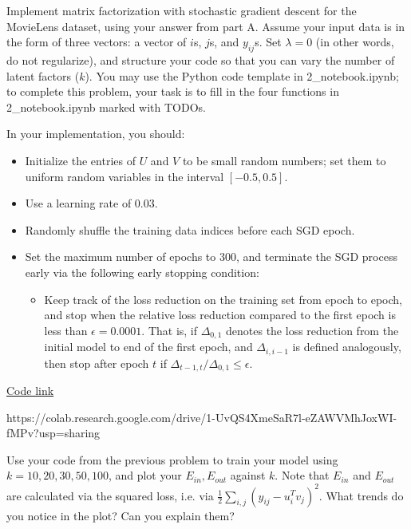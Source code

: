 Implement matrix factorization with stochastic gradient descent for the MovieLens dataset, using your answer from part A. Assume your input data is in the form of three vectors: a vector of $i$s, $j$s, and $y_{ij}$s. Set $\lambda = 0$ (in other words, do not regularize), and structure your code so that you can vary the number of latent factors ($k$). You may use the Python code template in 2_notebook.ipynb; to complete this problem, your task is to fill in the four functions in 2_notebook.ipynb marked with TODOs.

In your implementation, you should:

\begin{itemize}
\item Initialize the entries of $U$ and $V$ to be small random numbers; set them to uniform random variables in the interval $[-0.5, 0.5]$.
\item Use a learning rate of 0.03.
\item Randomly shuffle the training data indices before each SGD epoch.
\item Set the maximum number of epochs to 300, and terminate the SGD process early via the following early stopping condition:
\begin{itemize}
\item Keep track of the loss reduction on the training set from epoch to epoch, and stop when the relative loss reduction compared to the first epoch is less than $\epsilon = 0.0001$.  That is, if $\Delta_{0,1}$ denotes the loss reduction from the initial model to end of the first epoch, and $\Delta_{i, i-1}$ is defined analogously, then stop after epoch $t$ if $\Delta_{t-1,t} / \Delta_{0,1} \leq \epsilon$.
\end{itemize}
\end{itemize}

\begin{solution}
\href{https://colab.research.google.com/drive/1-UvQS4XmeSaR7l-eZAWVMhJoxWI-fMPv?usp=sharing}{Code link}

https://colab.research.google.com/drive/1-UvQS4XmeSaR7l-eZAWVMhJoxWI-fMPv?usp=sharing

\end{solution}

\newpage

\problem[5]
Use your code from the previous problem to train your model using $k=10, 20, 30, 50, 100$, and plot your $E_{in}, E_{out}$ against $k$. Note that $E_{in}$ and $E_{out}$ are calculated via the squared loss, i.e. via $\frac{1}{2}\sum_{i,j} \left( y_{ij} - u_i^Tv_j\right)^2$. What trends do you notice in the plot? Can you explain them?

